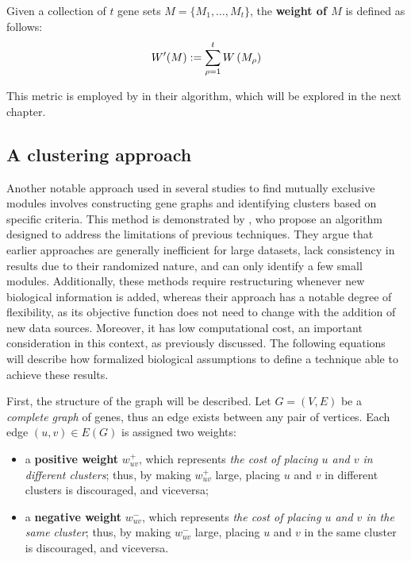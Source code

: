 \begin{definition}
    Given a collection of $t$ gene sets $M = \{ M_1, \ldots, M_t \}$, the \textbf{weight of $M$} is defined as follows: $$W'(M) := \sum_{\rho = 1}^t{W \left(M_\rho\right)}$$
\end{definition}

This metric is employed by \textcite{multi-dendrix} in their algorithm, which will be explored in the next chapter.

\subsection{A clustering approach} \label{c3_chap2} 

Another notable approach used in several studies to find mutually exclusive modules involves constructing gene graphs and identifying clusters based on specific criteria. This method is demonstrated by \textcite{c3}, who propose an algorithm designed to address the limitations of previous techniques. They argue that earlier approaches are generally inefficient for large datasets, lack consistency in results due to their randomized nature, and can only identify a few small modules. Additionally, these methods require restructuring whenever new biological information is added, whereas their approach has a notable degree of flexibility, as its objective function does not need to change with the addition of new data sources. Moreover, it has low computational cost, an important consideration in this context, as previously discussed. The following equations will describe how \textcite{c3} formalized biological assumptions to define a technique able to achieve these results.

First, the structure of the graph will be described. Let $G = (V, E)$ be a \textit{complete graph} of genes, thus an edge exists between any pair of vertices. Each edge $(u, v) \in E(G)$ is assigned two weights:

\begin{itemize}
    \item a \textbf{positive weight} $w_{uv}^+$, which represents \textit{the cost of placing $u$ and $v$ in different clusters}; thus, by making $w_{uv}^+$ large, placing $u$ and $v$ in different clusters is discouraged, and viceversa;
    \item a \textbf{negative weight} $w_{uv}^-$, which represents \textit{the cost of placing $u$ and $v$ in the same cluster}; thus, by making $w_{uv}^-$ large, placing $u$ and $v$ in the same cluster is discouraged, and viceversa.
\end{itemize}

